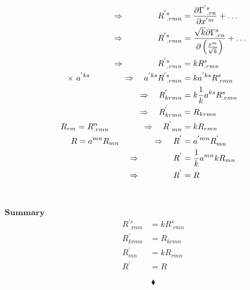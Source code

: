  \begin{align}
 \Rightarrow \spatie R^{'s}_{\ .rmn} &= \frac{\partial \Gamma^{'s}_{\ .rn}}{\partial x^{'m}} + \dots\\
 \Rightarrow \spatie R^{'s}_{\ .rmn} &= \frac{\sqrt{k}\partial \Gamma^{s}_{.rn}}{\partial \left(\frac{x^{m}}{\sqrt{k}}\right)} + \dots\\
 \Rightarrow \spatie R^{'s}_{\ .rmn} &= k R^{s}_{.rmn}\\
 \times \ a^{'ks}\spatie \Rightarrow \quad a^{'ks}R^{'s}_{\ .rmn} &= k a^{'ks}R^{s}_{.rmn}\\
 \Rightarrow \quad R^{'}_{krmn} &= k \frac{1}{k}a^{ks}R^{s}_{.rmn}\\
 \Rightarrow \quad R^{'}_{krmn} &=R_{krmn}\\
 R_{rm} = R^n_{.rmn} \spatie \Rightarrow \quad R^{'}_{\ mn} &= k R_{rmn}\\
 R = a^{mn}R_{mn} \spatie \Rightarrow \quad R^{'} &= a^{'mn}R^{'}_{mn}\\
 \Rightarrow \spatie  R^{'} &= \frac{1}{k}a^{mn}k R_{mn}\\
 \Rightarrow \spatie  R^{'} &=  R
\end{align}\\\\
$\mathbf{Summary}$\\
 \begin{align}
R^{'s}_{\ .rmn} &= k R^{s}_{.rmn}\\
R^{'}_{krmn} &=R_{krmn}\\
R^{'}_{ mn} &= k R_{rmn}\\
R^{'} &=  R
\end{align}

$$\blacklozenge$$
\newpage